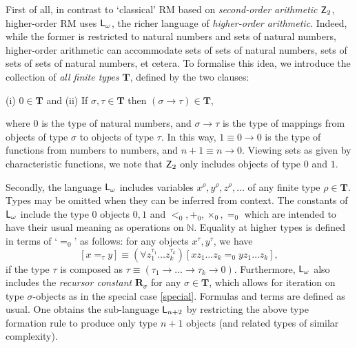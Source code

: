 \documentclass[reqno]{amsart}
\newcommand\be{\begin{equation}}
\newcommand\ee{\end{equation}}
\def\Z{\textup{\textsf{Z}}}
\def\N{{\mathbb  N}}
\def\L{\textsf{\textup{L}}}
\def\di{\rightarrow}
\numberwithin{equation}{section}
\numberwithin{thm}{section}
\begin{document}
First of all, in contrast to `classical' RM based on \emph{second-order arithmetic} $\Z_{2}$, higher-order RM uses $\L_{\omega}$, the richer language of \emph{higher-order arithmetic}.  
Indeed, while the former is restricted to natural numbers and sets of natural numbers, higher-order arithmetic can accommodate sets of sets of natural numbers, sets of sets of sets of natural numbers, et cetera.  
To formalise this idea, we introduce the collection of \emph{all finite types} $\mathbf{T}$, defined by the two clauses:
\begin{center}
(i) $0\in \mathbf{T}$   and   (ii)  If $\sigma, \tau\in \mathbf{T}$ then $( \sigma \di \tau) \in \mathbf{T}$,
\end{center}
where $0$ is the type of natural numbers, and $\sigma\di \tau$ is the type of mappings from objects of type $\sigma$ to objects of type $\tau$.
In this way, $1\equiv 0\di 0$ is the type of functions from numbers to numbers, and  $n+1\equiv n\di 0$.  Viewing sets as given by characteristic functions, we note that $\Z_{2}$ only includes objects of type $0$ and $1$.    

\smallskip

Secondly, the language $\L_{\omega}$ includes variables $x^{\rho}, y^{\rho}, z^{\rho},\dots$ of any finite type $\rho\in \mathbf{T}$.  Types may be omitted when they can be inferred from context.  
The constants of $\L_{\omega}$ include the type $0$ objects $0, 1$ and $ <_{0}, +_{0}, \times_{0},=_{0}$  which are intended to have their usual meaning as operations on $\N$.
Equality at higher types is defined in terms of `$=_{0}$' as follows: for any objects $x^{\tau}, y^{\tau}$, we have
\be\label{aparth}
[x=_{\tau}y] \equiv (\forall z_{1}^{\tau_{1}}\dots z_{k}^{\tau_{k}})[xz_{1}\dots z_{k}=_{0}yz_{1}\dots z_{k}],
\ee
if the type $\tau$ is composed as $\tau\equiv(\tau_{1}\di \dots\di \tau_{k}\di 0)$.  
Furthermore, $\L_{\omega}$ also includes the \emph{recursor constant} $\mathbf{R}_{\sigma}$ for any $\sigma\in \mathbf{T}$, which allows for iteration on type $\sigma$-objects as in the special case \eqref{special}.  Formulas and terms are defined as usual.  
One obtains the sub-language $\L_{n+2}$ by restricting the above type formation rule to produce only type $n+1$ objects (and related types of similar complexity).        
\end{document}
